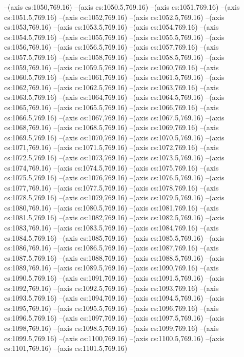--(axis cs:1050,769.16)
--(axis cs:1050.5,769.16)
--(axis cs:1051,769.16)
--(axis cs:1051.5,769.16)
--(axis cs:1052,769.16)
--(axis cs:1052.5,769.16)
--(axis cs:1053,769.16)
--(axis cs:1053.5,769.16)
--(axis cs:1054,769.16)
--(axis cs:1054.5,769.16)
--(axis cs:1055,769.16)
--(axis cs:1055.5,769.16)
--(axis cs:1056,769.16)
--(axis cs:1056.5,769.16)
--(axis cs:1057,769.16)
--(axis cs:1057.5,769.16)
--(axis cs:1058,769.16)
--(axis cs:1058.5,769.16)
--(axis cs:1059,769.16)
--(axis cs:1059.5,769.16)
--(axis cs:1060,769.16)
--(axis cs:1060.5,769.16)
--(axis cs:1061,769.16)
--(axis cs:1061.5,769.16)
--(axis cs:1062,769.16)
--(axis cs:1062.5,769.16)
--(axis cs:1063,769.16)
--(axis cs:1063.5,769.16)
--(axis cs:1064,769.16)
--(axis cs:1064.5,769.16)
--(axis cs:1065,769.16)
--(axis cs:1065.5,769.16)
--(axis cs:1066,769.16)
--(axis cs:1066.5,769.16)
--(axis cs:1067,769.16)
--(axis cs:1067.5,769.16)
--(axis cs:1068,769.16)
--(axis cs:1068.5,769.16)
--(axis cs:1069,769.16)
--(axis cs:1069.5,769.16)
--(axis cs:1070,769.16)
--(axis cs:1070.5,769.16)
--(axis cs:1071,769.16)
--(axis cs:1071.5,769.16)
--(axis cs:1072,769.16)
--(axis cs:1072.5,769.16)
--(axis cs:1073,769.16)
--(axis cs:1073.5,769.16)
--(axis cs:1074,769.16)
--(axis cs:1074.5,769.16)
--(axis cs:1075,769.16)
--(axis cs:1075.5,769.16)
--(axis cs:1076,769.16)
--(axis cs:1076.5,769.16)
--(axis cs:1077,769.16)
--(axis cs:1077.5,769.16)
--(axis cs:1078,769.16)
--(axis cs:1078.5,769.16)
--(axis cs:1079,769.16)
--(axis cs:1079.5,769.16)
--(axis cs:1080,769.16)
--(axis cs:1080.5,769.16)
--(axis cs:1081,769.16)
--(axis cs:1081.5,769.16)
--(axis cs:1082,769.16)
--(axis cs:1082.5,769.16)
--(axis cs:1083,769.16)
--(axis cs:1083.5,769.16)
--(axis cs:1084,769.16)
--(axis cs:1084.5,769.16)
--(axis cs:1085,769.16)
--(axis cs:1085.5,769.16)
--(axis cs:1086,769.16)
--(axis cs:1086.5,769.16)
--(axis cs:1087,769.16)
--(axis cs:1087.5,769.16)
--(axis cs:1088,769.16)
--(axis cs:1088.5,769.16)
--(axis cs:1089,769.16)
--(axis cs:1089.5,769.16)
--(axis cs:1090,769.16)
--(axis cs:1090.5,769.16)
--(axis cs:1091,769.16)
--(axis cs:1091.5,769.16)
--(axis cs:1092,769.16)
--(axis cs:1092.5,769.16)
--(axis cs:1093,769.16)
--(axis cs:1093.5,769.16)
--(axis cs:1094,769.16)
--(axis cs:1094.5,769.16)
--(axis cs:1095,769.16)
--(axis cs:1095.5,769.16)
--(axis cs:1096,769.16)
--(axis cs:1096.5,769.16)
--(axis cs:1097,769.16)
--(axis cs:1097.5,769.16)
--(axis cs:1098,769.16)
--(axis cs:1098.5,769.16)
--(axis cs:1099,769.16)
--(axis cs:1099.5,769.16)
--(axis cs:1100,769.16)
--(axis cs:1100.5,769.16)
--(axis cs:1101,769.16)
--(axis cs:1101.5,769.16)
